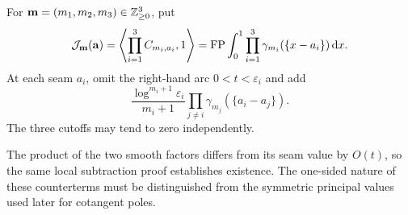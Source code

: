 \begin{definition}\label{tsc:Jdef}
For $\mathbf m=(m_1,m_2,m_3)\in\mathbb Z_{\ge0}^3$, put
\begin{equation}\label{tsc:J}
 \mathcal J_{\mathbf m}(\mathbf a)=
  \left\langle\prod_{i=1}^3 C_{m_i,a_i},1\right\rangle
  =\operatorname{FP}\int_0^1\prod_{i=1}^3
       \gamma_{m_i}(\{x-a_i\})\,\mathrm d x.
\end{equation}
At each seam $a_i$, omit the right-hand arc $0<t<\varepsilon_i$ and add
\begin{equation}\label{tsc:triple-counterterm}
 \frac{\log^{m_i+1}\varepsilon_i}{m_i+1}
       \prod_{j\ne i}\gamma_{m_j}(\{a_i-a_j\}).
\end{equation}
The three cutoffs may tend to zero independently.
\end{definition}
The product of the two smooth factors differs from its seam value by
$O(t)$, so the same local subtraction proof establishes existence. The
one-sided nature of these counterterms must be distinguished from the
symmetric principal values used later for cotangent poles.
